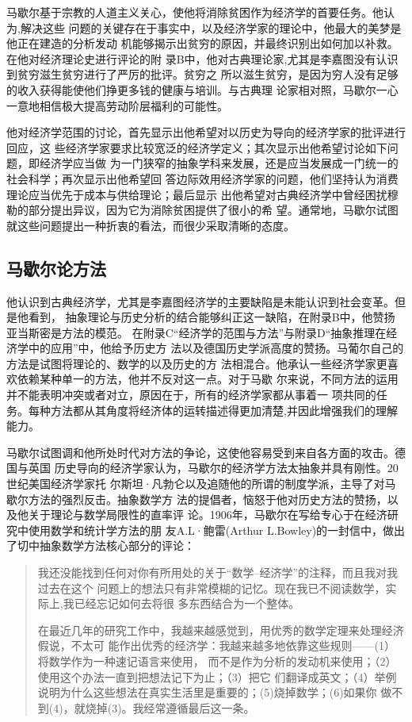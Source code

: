 马歇尔基于宗教的人道主义关心，使他将消除贫困作为经济学的首要任务。他认为,解决这些
问题的关键存在于事实中，以及经济学家的理论中，他最大的美梦是他正在建造的分析发动
机能够揭示出贫穷的原因，并最终识别出如何加以补救。在他对经济理论史进行评论的附
录B中，他对古典理论家,尤其是李嘉图没有认识到贫穷滋生贫穷进行了严厉的批评。贫穷之
所以滋生贫穷，是因为穷人没有足够的收入获得能使他们挣更多钱的健康与培训。与古典理
论家相对照，马歇尔一心一意地相信极大提高劳动阶层福利的可能性。

他对经济学范围的讨论，首先显示出他希望对以历史为导向的经济学家的批评进行回应，这
些经济学家要求比较宽泛的经济学定义；其次显示出他希望讨论如下问题，即经济学应当做
为一门狭窄的抽象学科来发展，还是应当发展成一门统一的社会科学；再次显示出他希望回
答边际效用经济学家的问题，他们坚持认为消费理论应当优先于成本与供给理论；最后显示
出他希望对古典经济学中曾经困扰穆勒的部分提出异议，因为它为消除贫困提供了很小的希
望。通常地，马歇尔试图就这些问题提出一种折衷的看法，而很少采取清晰的态度。

\subsection{马歇尔论方法}

他认识到古典经济学，尤其是李嘉图经济学的主要缺陷是未能认识到社会变革。但是他看到，
抽象理论与历史分析的结合能够纠正这一缺陷，在附录B中，他赞扬亚当斯密是方法的模范。
在附录C“经济学的范围与方法”与附录D“抽象推理在经济学中的应用”中，他给予历史方
法以及德国历史学派高度的赞扬。马葡尔自己的方法是试图将理论的、数学的以及历史的方
法相混合。他承认一些经济学家更喜欢依赖某种单一的方法，他并不反对这一点。对于马歇
尔来说，不同方法的运用并不能表明冲突或者对立，原因在于，所有的经济学家都从事着一
项共同的任务。每种方法都从其角度将经济体的运转描述得更加清楚,并因此增强我们的理解
能力。

马歇尔试图调和他所处时代对方法的争论，这使他容易受到来自各方面的攻击。德国与英国
历史导向的经济学家认为，马歇尔的经济学方法太抽象并具有刚性。20世纪美国经济学家托
尔斯坦·凡勃仑以及追随他的所谓的制度学派，主导了对马歇尔方法的强烈反击。抽象数学方
法的提倡者，恼怒于他对历史方法的赞扬，以及他关于理论与数学局限性的直率评
论。1906年，马歇尔在写给专心于在经济研究中使用数学和统计学方法的朋
友A.L·鲍雷(Arthur L.Bowley)的一封信中，做出了切中抽象数学方法核心部分的评论：
\begin{quotation}
  我还没能找到任何对你有所用处的关于“数学--经济学”的注释，而且我对我过去在这个
  问题上的想法只有非常模糊的记忆。现在我已不阅读数学，实际上,我已经忘记如何去将很
  多东西结合为一个整体。

  在最近几年的研究工作中，我越来越感觉到，用优秀的数学定理来处理经济假说，不太可
  能作出优秀的经济学：我越来越多地依靠这些规则——(1）将数学作为一种速记语言来使用，
  而不是作为分析的发动机来使用；（2）使用这个办法一直到把想法记下为止；（3）把它
  们翻译成英文；（4）举例说明为什么这些想法在真实生活里是重要的；(5)烧掉数学；(6)如果你
  做不到(4)，就烧掉(3)。我经常遵循最后这一条。
\end{quotation}

